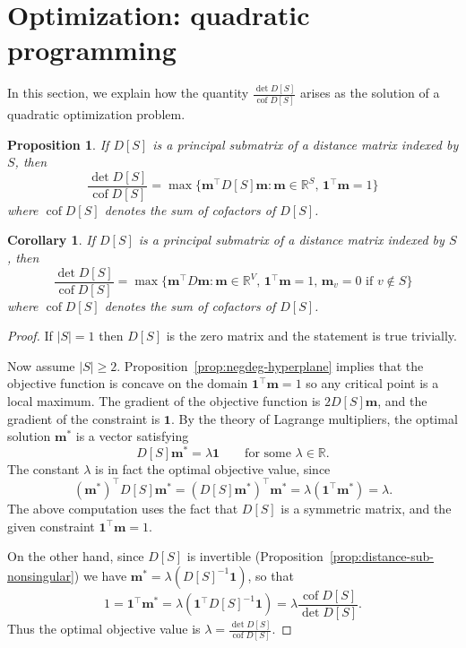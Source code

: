 \documentclass{amsart}
\newtheorem{prop}[thm]{Proposition}
\newtheorem{cor}[thm]{Corollary}
\theoremstyle{definition}
\newcommand{\RR}{\mathbb{R}}
\newcommand{\bone}{\mathbf{1}}
\newcommand{\boldm}{\mathbf{m}}
\newcommand{\tr}{\intercal}
\DeclareMathOperator{\cof}{cof}
\newcommand{\note}[1]{{\color{red} \sf $\diamondsuit$  {#1} $\diamondsuit$ }}
\begin{document}
\section{Optimization: quadratic programming}
\label{sec:optimization}

In this section, we explain how the quantity $\displaystyle \frac{\det D[S]}{\cof D[S]}$ arises as the solution of a quadratic optimization problem.


\begin{prop}
\label{prop:optimization}
If $D[S]$ is a principal submatrix of a distance matrix indexed by $S$, then 
\[
	\frac{\det D[S]}{\cof D[S]} = \max \{\boldm^\tr D[S] \boldm : \boldm \in \RR^S,\, \bone^\tr \boldm = 1 \}
\]
where $\cof D[S]$ denotes the sum of cofactors of $D[S]$.
\end{prop}

\begin{cor}
\label{cor:optimization}
If $D[S]$ is a principal submatrix of a distance matrix indexed by $S$, then 
\[
	\frac{\det D[S]}{\cof D[S]} = \max \{\boldm^\tr D \boldm : \boldm \in \RR^V,\, \bone^\tr \boldm = 1,\, \boldm_v = 0 \text{ if } v \not\in S \}
\]
where $\cof D[S]$ denotes the sum of cofactors of $D[S]$.
\end{cor}

\begin{proof}
If $|S| = 1$ then $D[S]$ is the zero matrix and the statement is true trivially.

Now assume $|S| \geq 2$.
Proposition~\ref{prop:negdeg-hyperplane} implies that 
the objective function is concave on the domain $\bone^\tr \boldm = 1$
so any critical point is a local maximum.
The gradient of the objective function is $2 D[S] \boldm$, 
and the gradient of the constraint is $\bone$.
By the theory of Lagrange multipliers, the optimal solution $\boldm^*$ is a vector satisfying
\[
	D[S] \boldm^* = \lambda \bone \qquad\text{for some }\lambda \in \RR.
\]
The constant $\lambda$ is in fact the optimal objective value, since
\[
	(\boldm^*)^\tr D[S] \boldm^* = (D[S] \boldm^*)^\tr \boldm^* = \lambda (\bone^\tr \boldm^*) = \lambda.
\]
The above computation uses the fact that $D[S]$ is a symmetric matrix, and the given constraint $\bone^\tr \boldm = 1$.

On the other hand,
since $D[S]$ is invertible (Proposition~\ref{prop:distance-sub-nonsingular}) we have $ \boldm^* = \lambda (D[S]^{-1} \bone) $, so that
\[
	1 = \bone^\tr \boldm^* = \lambda (\bone^\tr D[S]^{-1} \bone)
	= \lambda \frac{\cof D[S]}{\det D[S]}.
\]
Thus the optimal objective value is
$\displaystyle
	\lambda = \frac{\det D[S]}{\cof D[S]} .
$
\end{proof}
\end{document}
